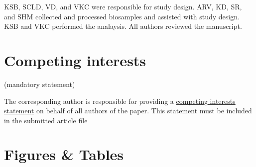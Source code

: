 \documentclass[fleqn,10pt]{wlscirep}
\begin{document}

KSB, SCLD, VD, and VKC were responsible for study design.
ARV, KD, SR, and SHM collected and processed biosamples and assisted with study design.
KSB and VKC performed the analaysis.
All authors reviewed the manuscript.

\section*{Competing interests} (mandatory statement)

The corresponding author is responsible for providing a \href{https://www.nature.com/sdata/policies/editorial-and-publishing-policies#competing}{competing interests statement} on behalf of all authors of the paper.
This statement must be included in the submitted article file


\section*{Figures \& Tables}







\end{document}
